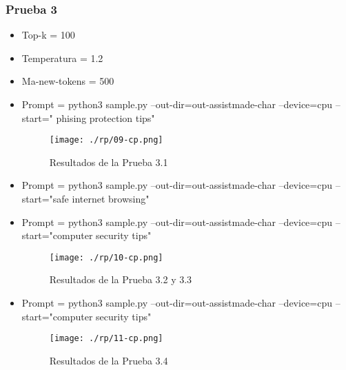 \subsubsection{ Prueba 3}\label{section:Adaptación de modelo nanoGPT}
    \begin{itemize}
        \item   Top-k = 100
        \item   Temperatura = 1.2
        \item   Ma-new-tokens = 500
            \item   Prompt = python3 sample.py --out-dir=out-assistmade-char --device=cpu --start=" phising protection tips"
            \begin{figure}[H]
              \centering %
                  \texttt{[image: ./rp/09-cp.png]} 
              \caption{Resultados de la Prueba 3.1\cite{}}
            \label{figure:Resultado 1}  %
            \end{figure}
            \item   Prompt = python3 sample.py --out-dir=out-assistmade-char --device=cpu --start="safe internet browsing"
            \item   Prompt = python3 sample.py --out-dir=out-assistmade-char --device=cpu --start="computer security tips"
            \begin{figure}[H]
              \centering %
                  \texttt{[image: ./rp/10-cp.png]} 
              \caption{Resultados de la Prueba 3.2 y 3.3\cite{}}
            \label{figure:Resultado 1}  %
            \end{figure}
            \item   Prompt = python3 sample.py --out-dir=out-assistmade-char --device=cpu --start="computer security tips"
            \begin{figure}[H]
              \centering %
                  \texttt{[image: ./rp/11-cp.png]} 
              \caption{Resultados de la Prueba 3.4\cite{}}
            \label{figure:Resultado 1}  %
            \end{figure}
    \end{itemize}
